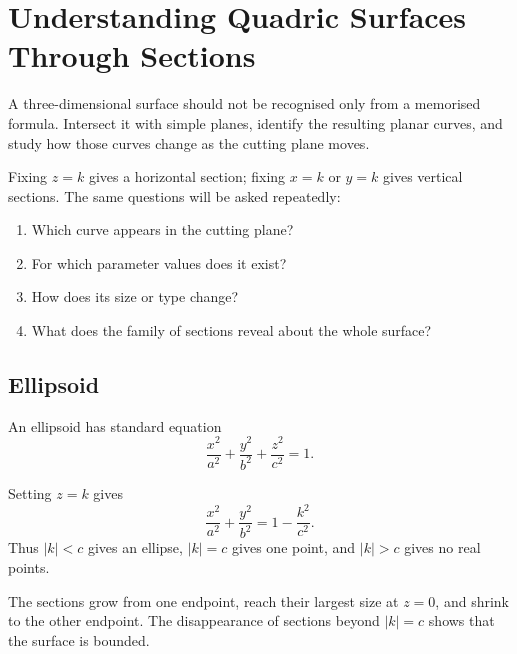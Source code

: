 \section{Understanding Quadric Surfaces Through Sections}

\begin{corebox}
A three-dimensional surface should not be recognised only from a memorised
formula. Intersect it with simple planes, identify the resulting planar curves,
and study how those curves change as the cutting plane moves.
\end{corebox}

Fixing $z=k$ gives a horizontal section; fixing $x=k$ or $y=k$ gives vertical
sections. The same questions will be asked repeatedly:
\begin{enumerate}
    \item Which curve appears in the cutting plane?
    \item For which parameter values does it exist?
    \item How does its size or type change?
    \item What does the family of sections reveal about the whole surface?
\end{enumerate}

\subsection{Ellipsoid}

\begin{definitionbox}
An ellipsoid has standard equation
\[
\boxed{
\frac{x^2}{a^2}+\frac{y^2}{b^2}+\frac{z^2}{c^2}=1
}.
\]
\end{definitionbox}

\begin{derivationbox}
Setting $z=k$ gives
\[
\frac{x^2}{a^2}+\frac{y^2}{b^2}=1-\frac{k^2}{c^2}.
\]
Thus $|k|<c$ gives an ellipse, $|k|=c$ gives one point, and $|k|>c$ gives no
real points.
\end{derivationbox}

\begin{interpretationbox}
The sections grow from one endpoint, reach their largest size at $z=0$, and
shrink to the other endpoint. The disappearance of sections beyond $|k|=c$
shows that the surface is bounded.
\end{interpretationbox}

\begin{center}
\end{center}

